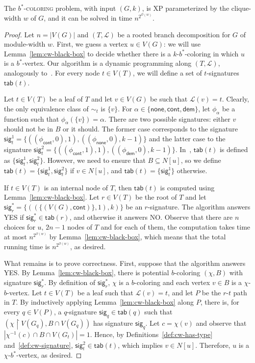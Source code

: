 \documentclass[runningheads, envcountsame]{llncs}
\newcommand{\seq}{\subseteq}
\newcommand{\ca}{\mathcal}
\newcommand{\XP}{\textsf{XP}\xspace}
\newcommand\cnone{\mathsf{none}}
\newcommand\ccontains{\mathsf{cont}}
\newcommand\cdemand{\mathsf{dem}}
\newcommand\csig{\mathsf{sig}}
\newcommand\tab{\mathsf{tab}}
\newcommand{\bscoloring}{$b^*$-\textsc{coloring}\xspace}
\begin{document}
\begin{theorem}
The \bscoloring problem, with input $(G, k)$, is \XP parameterized by the clique-width $w$ of $G$, and it can be solved in time $n^{2^{\ca O(w)}}$.
\end{theorem}
\begin{proof}
Let $n = |V(G)|$ and $(T, \ca L)$ be a rooted branch decomposition for $G$ of module-width $w$.
First, we guess a vertex $u \in V(G)$: we will use Lemma~\ref{lem:cw-black-box} to decide whether there is a $k$-$b^*$-coloring in which $u$ is a $b^*$-vertex.
Our algorithm is a dynamic programming along $(T, \ca L)$, analogously to~\cite[Theorem 3.16]{JaffkeLL24}.
For every node $t \in V(T)$, we will define a set of $t$-signatures $\tab(t)$.

Let $t \in V(T)$ be a leaf of $T$ and let $v \in V(G)$ be such that $\ca L(v) = t$.
Clearly, the only equivalence class of $\sim_t$ is $\{v\}$.
For $\alpha \in \{\cnone,\ccontains,\cdemand\}$, let $\phi_\alpha$ be a function such that $\phi_\alpha(\{v\}) = \alpha$.
There are two possible signatures: either $v$ should not be in $B$ or it should.
The former case corresponds to the signature $\csig_t^1 = \{((\phi_\ccontains, 0), 1), ((\phi_\cnone, 0), k-1)\}$ and the latter case to the signature $\csig_t^2 = \{((\phi_\ccontains, 1), 1), ((\phi_\cdemand, 0), k-1)\}$.
In~\cite{JaffkeLL24}, $\tab(t)$ is defined as $\{\csig_t^1, \csig_t^2\}$.
However, we need to ensure that $B \seq N[u]$, so we define $\tab(t) = \{\csig_t^1, \csig_t^2\}$ if $v \in N[u]$, and $\tab(t) = \{\csig_t^1\}$ otherwise.

If $t \in V(T)$ is an internal node of $T$, then $\tab(t)$ is computed using Lemma~\ref{lem:cw-black-box}.
Let $r \in V(T)$ be the root of $T$ and let $\csig_r^* = \{((\{(V(G), \ccontains)\}, 1), k)\}$ be an $r$-signature.
The algorithm answers YES if $\csig_r^* \in \tab(r)$, and otherwise it answers NO.
Observe that there are $n$ choices for $u$, $2n-1$ nodes of $T$ and for each of them, the computation takes time at most $n^{2^{\ca O(w)}}$ by Lemma~\ref{lem:cw-black-box}, which means that the total running time is $n^{2^{\ca O(w)}}$, as desired.

What remains is to prove correctness.
First, suppose that the algorithm answers YES. By Lemma~\ref{lem:cw-black-box}, there is potential $b$-coloring $(\chi, B)$ with signature $\csig_r^*$.
By definition of $\csig_r^*$, $\chi$ is a $b$-coloring and each vertex $v \in B$ is a $\chi$-$b$-vertex.
Let $t \in V(T)$ be a leaf such that $\ca L(v) = t$, and let $P$ be the $r$-$t$ path in $T$.
By inductively applying Lemma~\ref{lem:cw-black-box} along $P$, there is, for every $q \in V(P)$, a $q$-signature $\csig_q \in \tab(q)$ such that $(\chi \upharpoonright V(G_q), B \cap V(G_q))$ has signature $\csig_q$.
Let $c = \chi(v)$ and observe that $|\chi^{-1}(c) \cap B \cap V(G_t)| = 1$.
Hence, by Definitions~\ref{def:cw-has-type} and~\ref{def:cw-signature}, $\csig_t^2 \in \tab(t)$, which implies $v \in N[u]$.
Therefore, $u$ is a $\chi$-$b^*$-vertex, as desired.


\end{proof}
\end{document}
